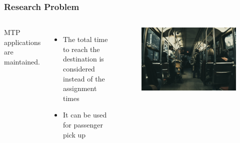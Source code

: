 \documentclass[aspectratio=169]{beamer}
\begin{document}
\begin{frame}
\frametitle{Research Problem}
\begin{columns}
MTP applications are maintained.
\begin{itemize}
\item The total time to reach the destination is considered instead of the assignment times
\item It can be used for passenger pick up
\end{itemize}

    \begin{figure}[ht]
    \centering
    \includegraphics[width=\textwidth]{images/bus}
    \end{figure}
\end{columns}
\end{frame}
\end{document}
